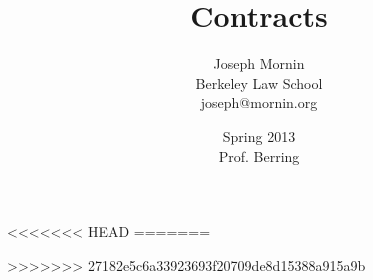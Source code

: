 \documentclass[letterpaper,titlepage]{article}
\begin{document}
\title{Contracts}
\author{Joseph Mornin\\Berkeley Law School\\joseph@mornin.org}
\date{Spring 2013\\Prof. Berring}
\maketitle
\tableofcontents
\pagebreak


\newpage

\newpage

\newpage

\newpage

\newpage

\newpage
<<<<<<< HEAD
=======

\newpage
>>>>>>> 27182e5c6a33923693f20709de8d15388a915a9b

\newpage

\end{document}
